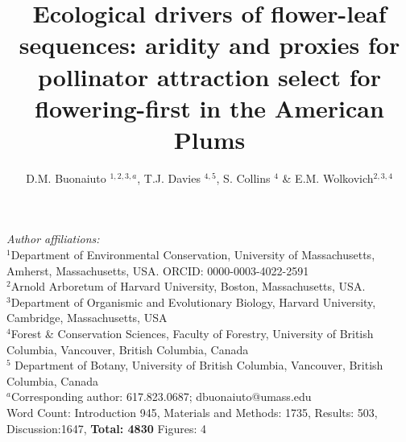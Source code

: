 \documentclass{article}[12pt]
\title{Ecological drivers of flower-leaf sequences: aridity and proxies for pollinator attraction select for flowering-first in the American Plums}
\author{D.M. Buonaiuto $^{1,2,3,a}$, T.J. Davies $^{4,5}$, S. Collins $^{4}$ \& E.M. Wolkovich$^{2,3,4}$}
\date{}
\begin{document}

\maketitle
 \noindent \emph{Author affiliations:}\\
\noindent $^1$Department of Environmental Conservation, University of Massachusetts, Amherst, Massachusetts, USA. ORCID: 0000-0003-4022-2591\\
\noindent 
$^2$Arnold Arboretum of Harvard University, Boston, Massachusetts, USA.\\
$^3$Department of Organismic and Evolutionary Biology, Harvard University, Cambridge, Massachusetts, USA \\
$^4$Forest \& Conservation Sciences, Faculty of Forestry, University of British Columbia, Vancouver, British Columbia, Canada\\
$^5$ Department of Botany, University of British Columbia, Vancouver, British Columbia, Canada\\
$^a$Corresponding author: 617.823.0687; dbuonaiuto@umass.edu\\

Word Count: Introduction 945, Materials and Methods: 1735, Results: 503, Discussion:1647, \textbf{Total: 4830}
Figures: 4\\

\pagebreak
\end{document}
